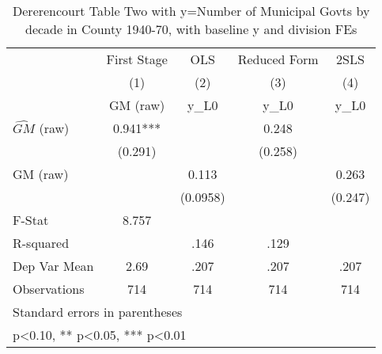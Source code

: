 \begin{table}[htbp]\centering
\def\sym#1{\ifmmode^{#1}\else\(^{#1}\)\fi}
\caption{Dererencourt Table Two with y=Number of Municipal Govts by decade in County 1940-70, with baseline y and division FEs}
\begin{tabular}{l*{4}{c}}
\toprule
                    & First Stage   &         OLS   &Reduced Form   &        2SLS   \\
                    &\multicolumn{1}{c}{(1)}&\multicolumn{1}{c}{(2)}&\multicolumn{1}{c}{(3)}&\multicolumn{1}{c}{(4)}\\
                    &\multicolumn{1}{c}{GM  (raw)}&\multicolumn{1}{c}{y\_L0}&\multicolumn{1}{c}{y\_L0}&\multicolumn{1}{c}{y\_L0}\\
\midrule
$\hat{GM}$ (raw)    &       0.941***&               &       0.248   &               \\
                    &     (0.291)   &               &     (0.258)   &               \\
\addlinespace
GM  (raw)           &               &       0.113   &               &       0.263   \\
                    &               &    (0.0958)   &               &     (0.247)   \\
\midrule
F-Stat              &       8.757   &               &               &               \\
R-squared           &               &        .146   &        .129   &               \\
Dep Var Mean        &        2.69   &        .207   &        .207   &        .207   \\
Observations        &         714   &         714   &         714   &         714   \\
\bottomrule
\multicolumn{5}{l}{\footnotesize Standard errors in parentheses}\\
\multicolumn{5}{l}{\footnotesize * p<0.10, ** p<0.05, *** p<0.01}\\
\end{tabular}
\end{table}
